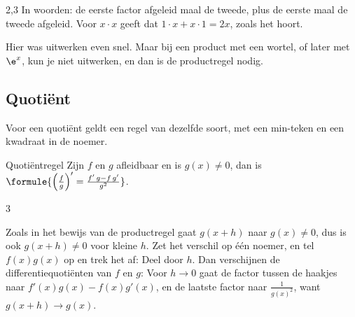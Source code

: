 \begin{alleenvoor}{2,3}
In woorden: de eerste factor afgeleid maal de tweede, plus de eerste maal de tweede afgeleid. Voor $x \cdot x$ geeft dat $1 \cdot x + x \cdot 1 = 2x$, zoals het hoort.


Hier was uitwerken even snel. Maar bij een product met een wortel, of later met $\e^x$, kun je niet uitwerken, en dan is de productregel nodig.

\begin{oefeningen}
\end{oefeningen}

\subsection{Quotiënt}

Voor een quotiënt geldt een regel van dezelfde soort, met een min-teken en een kwadraat in de noemer.

\begin{theorie}
\begin{stelling}{Quotiëntregel}
Zijn $f$ en $g$ afleidbaar en is $g(x) \neq 0$, dan is \quad $\formule{\Bigl(\frac{f}{g}\Bigr)' = \frac{f'\,g - f\,g'}{g^2}}$.
\end{stelling}
\begin{alleenvoor}{3}
\begin{bewijs}
Zoals in het bewijs van de productregel gaat $g(x + h)$ naar $g(x) \neq 0$, dus is ook $g(x + h) \neq 0$ voor kleine $h$. Zet het verschil op één noemer, en tel $f(x)g(x)$ op en trek het af:
Deel door $h$. Dan verschijnen de differentiequotiënten van $f$ en $g$:
Voor $h \to 0$ gaat de factor tussen de haakjes naar $f'(x)g(x) - f(x)g'(x)$, en de laatste factor naar $\frac{1}{g(x)^2}$, want $g(x + h) \to g(x)$.
\end{bewijs}
\end{alleenvoor}
\end{theorie}


\end{alleenvoor}
